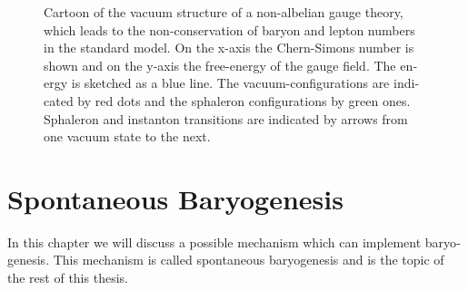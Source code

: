 \documentclass[master,       %
               twoside,        %
               BCOR10mm,       %
               english,ngerman, %
               ]{GAUBM}
\begin{document}
\begin{otherlanguage}{english}
\begin{figure}[H]
	\centering
	\caption{Cartoon of the vacuum structure of a non-albelian gauge theory, which leads to the non-conservation of baryon and lepton numbers in the standard model.
		On the x-axis the Chern-Simons number is shown and on the y-axis the free-energy of the gauge field.
		The energy is sketched as a blue line. The vacuum-configurations are indicated by red dots and the sphaleron configurations by green ones. Sphaleron and instanton transitions are indicated by arrows from one vacuum state
		to the next.
	}
	\label{fig:sphaleron_cartoon}
\end{figure}


\chapter{Spontaneous Baryogenesis}
\label{sec:spontaneous_baryogenesis}
\label{sec:sbg}

In this chapter we will discuss a possible mechanism which can implement baryogenesis. This mechanism is called spontaneous baryogenesis and is the topic of the rest of this thesis.


\end{otherlanguage}
\end{document}
